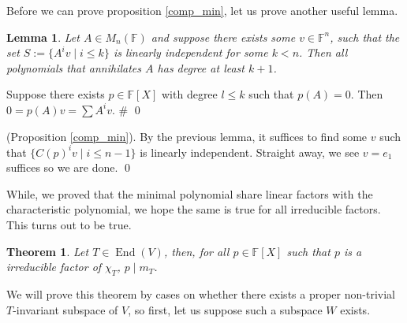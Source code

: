 \documentclass[
]{article}
\newtheorem{theorem}{Theorem}
\newtheorem{lemma}{Lemma}[section]
\theoremstyle{definition}
\begin{document}
Before we can prove proposition \ref{comp_min}, let us prove another
useful lemma.

\begin{lemma}
  Let \(A \in M_n(\mathbb{F})\) and suppose there exists some \(v \in \mathbb{F}^n\),
  such that the set \(S := \{A^i v \mid i \le k \}\) is linearly independent for 
  some \(k < n\). Then all polynomials that annihilates \(A\) has degree at 
  least \(k + 1\).
\end{lemma}
\proof

Suppose there exists \(p \in \mathbb{F}[X]\) with degree \(l \le k\)
such that \(p(A) = 0\). Then \(0 = p(A)v = \sum A^i v\). \# \qed

\proof

(Proposition \ref{comp_min}). By the previous lemma, it suffices to find
some \(v\) such that \(\{C(p)^i v \mid i \le n - 1\}\) is linearly
independent. Straight away, we see \(v = e_1\) suffices so we are done.
\qed

While, we proved that the minimal polynomial share linear factors with
the characteristic polynomial, we hope the same is true for all
irreducible factors. This turns out to be true.

\begin{theorem}
  Let \(T \in \mathop{\mathrm{End}}(V)\), then, for all \(p \in \mathbb{F}[X]\) such that 
  \(p\) is a irreducible factor of \(\chi_T\), \(p \mid m_T\).
\end{theorem}
\proof

We will prove this theorem by cases on whether there exists a proper
non-trivial \(T\)-invariant subspace of \(V\), so first, let us suppose
such a subspace \(W\) exists.
\end{document}
